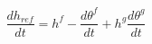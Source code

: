 \begin{equation}
\frac{dh_{ref}}{dt} = h^f- \frac{d\theta^f }{dt} + h^g \frac{d\theta^g }{dt}
\end{equation}
